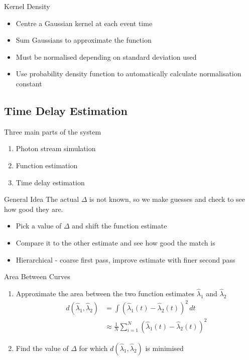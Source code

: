 \documentclass{beamer}
\begin{document}
\begin{frame}{Kernel Density}
  \begin{itemize}
  \item Centre a Gaussian kernel at each event time
  \item Sum Gaussians to approximate the function
  \item Must be normalised depending on standard deviation used
  \item Use probability density function to automatically calculate normalisation constant
  \end{itemize}
\end{frame}



\subsection{Time Delay Estimation}

\begin{frame}
  Three main parts of the system
  \begin{enumerate}
  \item Photon stream simulation
  \item Function estimation
  \item \alert{Time delay estimation}
  \end{enumerate}
\end{frame}

\begin{frame}{General Idea}
  The actual $\Delta$ is not known, so we make guesses and check to see how good
  they are.
  \begin{itemize}
  \item Pick a value of $\Delta$ and shift the function estimate
  \item Compare it to the other estimate and see how good the match is
  \item Hierarchical - coarse first pass, improve estimate with finer second pass
  \end{itemize}
\end{frame}

\begin{frame}{Area Between Curves}
  \begin{enumerate}
  \item Approximate the area between the two function estimates $\hat{\lambda}_1$
    and $\hat{\lambda}_2$
    \begin{align*}
      d(\hat{\lambda}_1,\hat{\lambda}_2)&=\int(\hat{\lambda}_1(t)-\hat{\lambda}_2(t))^2\,dt\\
      &\approx\frac{1}{N}\sum_{i=1}^N(\hat{\lambda}_1(t)-\hat{\lambda}_2(t))^2
    \end{align*}
  \item Find the value of $\Delta$ for which
    $d(\hat{\lambda}_1,\hat{\lambda}_2)$ is minimised
  \end{enumerate}
\end{frame}
\end{document}
